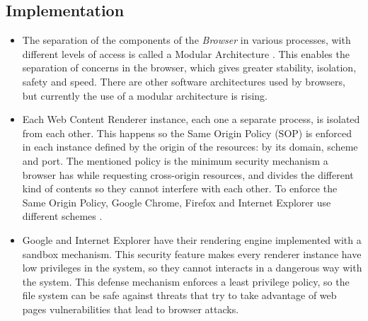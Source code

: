 \documentclass[prodmode,acmtecs]{acmsmall}
\begin{document}
  \subsection*{Implementation}
    \begin{itemize}\leftskip0.2em
      \item The separation of the components of the \textit{Browser} in various processes, with different levels of access is called a Modular Architecture \cite{Vrbanec2013}. This enables the separation of concerns in the browser, which gives greater stability, isolation, safety and speed. There are other software architectures used by browsers, but currently the use of a modular architecture is rising.
      \item Each Web Content Renderer instance, each one a separate process, is isolated \cite{GoogleChromeIsolation,FirefoxThreatModel} from each other. This happens so the Same Origin Policy (SOP) \cite{W3C-SOP} is enforced in each instance defined by the origin of the resources: by its domain, scheme and port. The mentioned policy  is the minimum security mechanism a browser has while requesting cross-origin resources, and divides the different kind of contents so they cannot interfere with each other. To enforce the Same Origin Policy, Google Chrome, Firefox and Internet Explorer use different schemes \cite{Crowley2010,Reis2009,Jackson2008}.
      \item Google and Internet Explorer have their rendering engine implemented with a sandbox mechanism. This security feature makes every renderer instance have low privileges in the system, so they cannot interacts in a dangerous way with the system. This defense mechanism enforces a least privilege policy, so the file system can be safe against threats that try to take advantage of web pages vulnerabilities that lead to browser attacks.
    \end{itemize}
\end{document}
